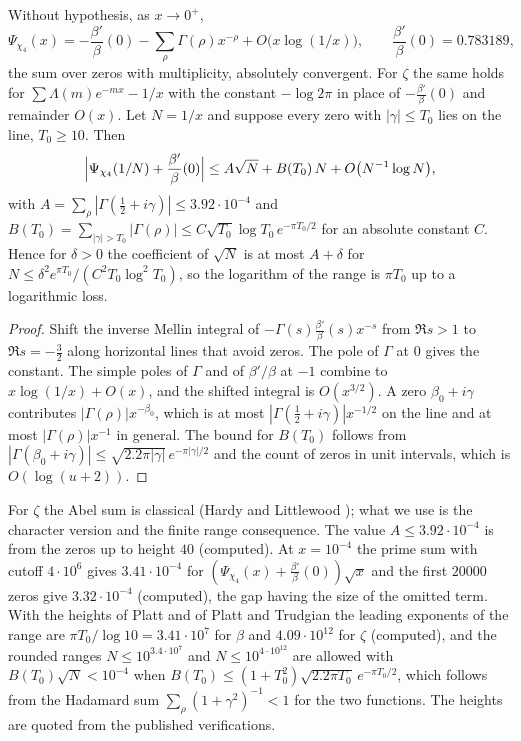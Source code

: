 \begin{theorem}\label{gbm:thm:abel}
Without hypothesis, as $x\to0^+$,
\[
\Psi_{\chi_4}(x)=-\frac{\beta'}{\beta}(0)-\sum_\rho\Gamma(\rho)x^{-\rho}+O\bigl(x\log(1/x)\bigr),\qquad \frac{\beta'}{\beta}(0)=0.783189,
\]
the sum over zeros with multiplicity, absolutely convergent. For $\zeta$ the same holds for $\sum\Lambda(m)e^{-mx}-1/x$ with the constant $-\log2\pi$ in place of $-\frac{\beta'}\beta(0)$ and remainder $O(x)$. Let $N=1/x$ and suppose every zero with $|\gamma|\le T_0$ lies on the line, $T_0\ge10$. Then
\[
\Bigl|\Psi_{\chi_4}(1/N)+\frac{\beta'}{\beta}(0)\Bigr|\le A\sqrt N+B(T_0)\,N+O\bigl(N^{-1}\log N\bigr),
\]
with $A=\sum_\rho|\Gamma(\frac12+i\gamma)|\le3.92\cdot10^{-4}$ and $B(T_0)=\sum_{|\gamma|>T_0}|\Gamma(\rho)|\le C\sqrt{T_0}\log T_0\,e^{-\pi T_0/2}$ for an absolute constant $C$. Hence for $\delta>0$ the coefficient of $\sqrt N$ is at most $A+\delta$ for $N\le\delta^2e^{\pi T_0}/(C^2T_0\log^2T_0)$, so the logarithm of the range is $\pi T_0$ up to a logarithmic loss.
\end{theorem}

\begin{proof}
Shift the inverse Mellin integral of $-\Gamma(s)\frac{\beta'}{\beta}(s)x^{-s}$ from $\Re s>1$ to $\Re s=-\frac32$ along horizontal lines that avoid zeros. The pole of $\Gamma$ at $0$ gives the constant. The simple poles of $\Gamma$ and of $\beta'/\beta$ at $-1$ combine to $x\log(1/x)+O(x)$, and the shifted integral is $O(x^{3/2})$. A zero $\beta_0+i\gamma$ contributes $|\Gamma(\rho)|x^{-\beta_0}$, which is at most $|\Gamma(\frac12+i\gamma)|x^{-1/2}$ on the line and at most $|\Gamma(\rho)|x^{-1}$ in general. The bound for $B(T_0)$ follows from $|\Gamma(\beta_0+i\gamma)|\le\sqrt{2.2\pi|\gamma|}\,e^{-\pi|\gamma|/2}$ and the count of zeros in unit intervals, which is $O(\log(u+2))$.
\end{proof}

For $\zeta$ the Abel sum is classical (Hardy and Littlewood \cite{HL16}); what we use is the character version and the finite range consequence. The value $A\le3.92\cdot10^{-4}$ is from the zeros up to height $40$ (computed). At $x=10^{-4}$ the prime sum with cutoff $4\cdot10^6$ gives $3.41\cdot10^{-4}$ for $(\Psi_{\chi_4}(x)+\frac{\beta'}{\beta}(0))\sqrt x$ and the first $20000$ zeros give $3.32\cdot10^{-4}$ (computed), the gap having the size of the omitted term. With the heights of Platt and of Platt and Trudgian the leading exponents of the range are $\pi T_0/\log10=3.41\cdot10^7$ for $\beta$ and $4.09\cdot10^{12}$ for $\zeta$ (computed), and the rounded ranges $N\le10^{3.4\cdot10^7}$ and $N\le10^{4\cdot10^{12}}$ are allowed with $B(T_0)\sqrt N<10^{-4}$ when $B(T_0)\le(1+T_0^2)\sqrt{2.2\pi T_0}\,e^{-\pi T_0/2}$, which follows from the Hadamard sum $\sum_\rho(1+\gamma^2)^{-1}<1$ for the two functions. The heights are quoted from the published verifications.

